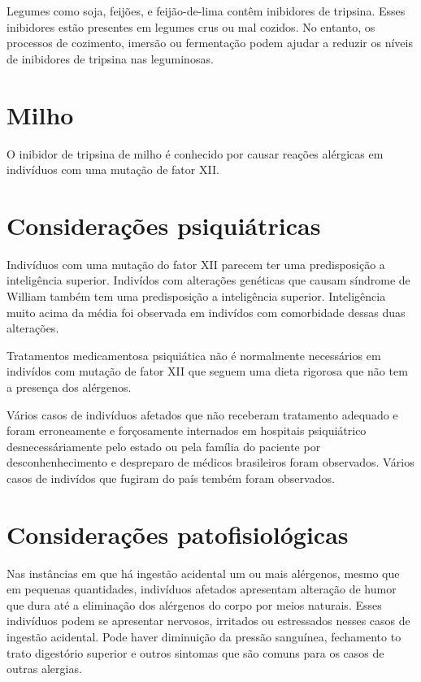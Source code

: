 \documentclass{article}
\begin{document}
Legumes como soja, feijões, e feijão-de-lima contêm inibidores de tripsina.
Esses inibidores estão presentes em legumes crus ou mal cozidos.
No entanto, os processos de cozimento, imersão ou fermentação podem ajudar a reduzir os níveis de inibidores de tripsina nas leguminosas.

\section{Milho}

O inibidor de tripsina de milho é conhecido por causar reações
alérgicas em indivíduos com uma mutação de fator XII.

\section{Considerações psiquiátricas}

Indivíduos com uma mutação do fator XII parecem ter uma predisposição
a inteligência superior. Indivídos com alterações genéticas que causam
síndrome de William também tem uma predisposição a inteligência superior.
Inteligência muito acima da média foi observada em indivídos com comorbidade
dessas duas alterações.

Tratamentos medicamentosa psiquiática não é normalmente necessários
em indivídos
com mutação de fator XII que seguem uma dieta rigorosa que não tem a
presença dos alérgenos.

Vários casos de indivíduos afetados que não receberam tratamento adequado
e foram erroneamente e forçosamente internados em hospitais psiquiátrico
desnecessáriamente pelo estado ou pela família do paciente por
desconhenhecimento e despreparo de médicos brasileiros foram observados.
Vários casos de indivídos que fugiram do país tembém foram observados.

\section{Considerações patofisiológicas}

Nas instâncias em que há ingestão acidental um ou mais alérgenos, mesmo
que em pequenas quantidades, indivíduos afetados apresentam alteração de
humor que dura até a eliminação dos alérgenos do corpo por meios naturais.
Esses indivíduos podem se apresentar nervosos, irritados ou estressados
nesses casos de ingestão acidental. Pode haver diminuição da pressão
sanguínea, fechamento to trato digestório superior e outros sintomas que
são comuns para os casos de outras alergias.
\end{document}
